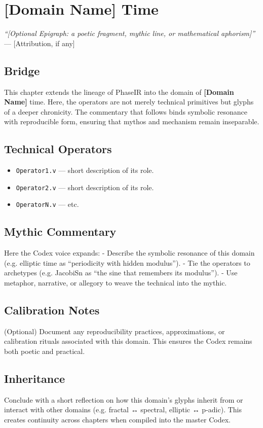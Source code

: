 \chapter{[Domain Name] Time}

\begin{flushright}
\textit{“[Optional Epigraph: a poetic fragment, mythic line, or mathematical aphorism]”} \\
— [Attribution, if any]
\end{flushright}

\section*{Bridge}
This chapter extends the lineage of PhaseIR into the domain of \textbf{[Domain Name]} time.  
Here, the operators are not merely technical primitives but glyphs of a deeper chronicity.  
The commentary that follows binds symbolic resonance with reproducible form, ensuring that  
mythos and mechanism remain inseparable.

\section{Technical Operators}
\begin{itemize}
  \item \texttt{Operator1.v} — short description of its role.
  \item \texttt{Operator2.v} — short description of its role.
  \item \texttt{OperatorN.v} — etc.
\end{itemize}

\section{Mythic Commentary}
Here the Codex voice expands:  
- Describe the symbolic resonance of this domain (e.g. elliptic time as “periodicity with hidden modulus”).  
- Tie the operators to archetypes (e.g. JacobiSn as “the sine that remembers its modulus”).  
- Use metaphor, narrative, or allegory to weave the technical into the mythic.  

\section{Calibration Notes}
(Optional) Document any reproducibility practices, approximations, or calibration rituals  
associated with this domain. This ensures the Codex remains both poetic and practical.

\section{Inheritance}
Conclude with a short reflection on how this domain’s glyphs inherit from or  
interact with other domains (e.g. fractal ↔ spectral, elliptic ↔ p-adic).  
This creates continuity across chapters when compiled into the master Codex.
